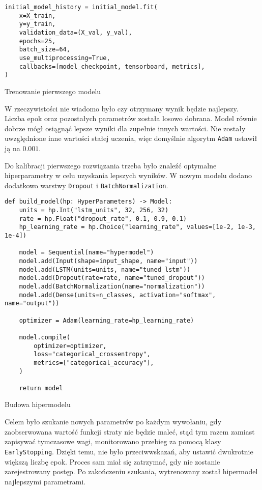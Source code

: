 \begin{listing}[H]
    \color{white}
    \begin{verbatim}
initial_model_history = initial_model.fit(
    x=X_train,
    y=y_train,
    validation_data=(X_val, y_val),
    epochs=25,
    batch_size=64,
    use_multiprocessing=True,
    callbacks=[model_checkpoint, tensorboard, metrics],
)
    \end{verbatim}
    \caption{Trenowanie pierwszego modelu}
    \label{lst:initial-model-training}
\end{listing}

W rzeczywistości nie wiadomo było czy otrzymany wynik będzie najlepszy. Liczba epok oraz pozostałych parametrów została losowo dobrana. Model równie dobrze mógł osiągnąć lepsze wyniki dla zupełnie innych wartości. Nie zostały uwzględnione inne wartości stałej uczenia, więc domyślnie algorytm \texttt{Adam} ustawił ją na $0.001$.

Do kalibracji pierwszego rozwiązania trzeba było znaleźć optymalne hiperparametry w celu uzyskania lepszych wyników. W nowym modelu dodano dodatkowo warstwy \texttt{Dropout} i \texttt{BatchNormalization}.

\begin{listing}[H]
    \color{white}
    \begin{verbatim}
def build_model(hp: HyperParameters) -> Model:
    units = hp.Int("lstm_units", 32, 256, 32)
    rate = hp.Float("dropout_rate", 0.1, 0.9, 0.1)
    hp_learning_rate = hp.Choice("learning_rate", values=[1e-2, 1e-3, 1e-4])

    model = Sequential(name="hypermodel")
    model.add(Input(shape=input_shape, name="input"))
    model.add(LSTM(units=units, name="tuned_lstm"))
    model.add(Dropout(rate=rate, name="tuned_dropout"))
    model.add(BatchNormalization(name="normalization"))
    model.add(Dense(units=n_classes, activation="softmax", name="output"))

    optimizer = Adam(learning_rate=hp_learning_rate)

    model.compile(
        optimizer=optimizer,
        loss="categorical_crossentropy",
        metrics=["categorical_accuracy"],
    )

    return model
    \end{verbatim}
    \caption{Budowa hipermodelu}
    \label{lst:hypermodel-build}
\end{listing}

Celem było szukanie nowych parametrów po każdym wywołaniu, gdy zaobserwowana wartość funkcji straty nie będzie maleć, stąd tym razem zamiast zapisywać tymczasowe wagi, monitorowano przebieg za pomocą klasy \texttt{EarlyStopping}. Dzięki temu, nie było przeciwwskazań, aby ustawić dwukrotnie większą liczbę epok. Proces sam miał się zatrzymać, gdy nie zostanie zarejestrowany postęp. Po zakończeniu szukania, wytrenowany został hipermodel najlepszymi parametrami.

